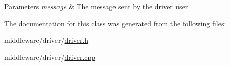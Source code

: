 \begin{DoxyParams}{Parameters}
{\em message} & The message sent by the driver user \\
\hline
\end{DoxyParams}


The documentation for this class was generated from the following files:\begin{DoxyCompactItemize}
\item 
middleware/driver/\hyperlink{driver_8h}{driver.h}\item 
middleware/driver/\hyperlink{driver_8cpp}{driver.cpp}\end{DoxyCompactItemize}
